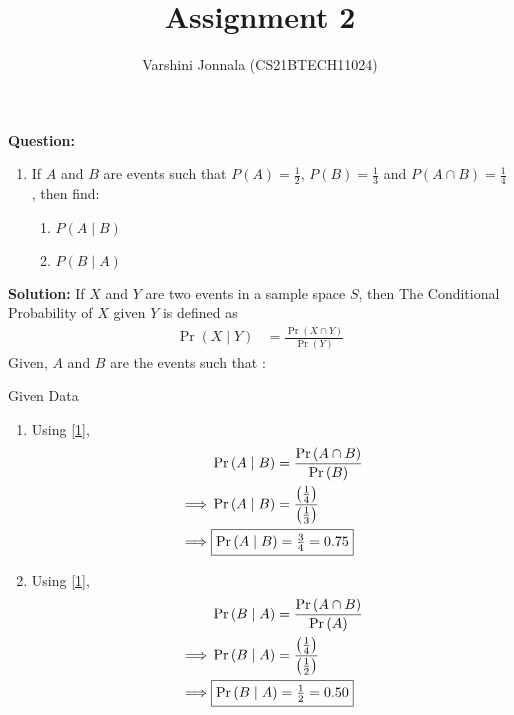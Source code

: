 \documentclass[journal,12pt,twocolumn]{IEEEtran}
\title{Assignment 2}
\author{Varshini Jonnala (CS21BTECH11024)}
\providecommand{\pr}[1]{\ensuremath{\Pr\left(#1\right)}}
\providecommand{\brak}[1]{\ensuremath{\left(#1\right)}}
\newcommand{\question}{\noindent \textbf{Question: }}
\newcommand{\solution}{\noindent \textbf{Solution: }}
\begin{document}
    \maketitle
    
    \question
    \begin{enumerate}[label=]
        \item  If $A$ and $B$ are events such that $P(A) = \frac{1}{2}$, $P(B)= \frac{1}{3}$ and $P(A \cap B)= \frac{1}{4}$ , then find:
    \begin{enumerate}
        \item $P(A \mid B)$
        \item $P(B \mid A)$
    \end{enumerate}
    \end{enumerate}

    \solution 
     If $X$ and $Y$ are two events in a sample space $S$, then The Conditional Probability of $X$ given $Y$ is defined as
        \begin{align}
        \label{1}  \pr{X \mid Y} &= \frac{\pr{X \cap Y}}{\pr{Y}}  
        \end{align}
        Given, $A$ and $B$ are the events such that :
        \begin{table}[ht!]
            
        \caption{Given Data}
	        \label{Tables:Table}
        \end{table}
        \begin{enumerate}
            \item Using \eqref{1},
            \begin{align}
                &\pr{A \mid B} = \frac{\pr{A \cap B}}{\pr{B}}\\
                \implies &\pr{A \mid B} = {\frac{\brak{\frac{1}{4}}}{\brak{\frac{1}{3}}}}\\
                \implies &\fbox{$\pr{A \mid B} =\frac{3}{4} = 0.75$}
            \end{align}
            
            \item Using \eqref{1},
                \begin{align}
                &\pr{B \mid A} = \frac{\pr{A \cap B}}{\pr{A}}\\
                \implies &\pr{B \mid A} = {\frac{\brak{\frac{1}{4}}}{\brak{\frac{1}{2}}}}\\
                \implies &\fbox{$\pr{B \mid A} = \frac{1}{2} = 0.50$}
            \end{align} 
        \end{enumerate}
    
\end{document}
